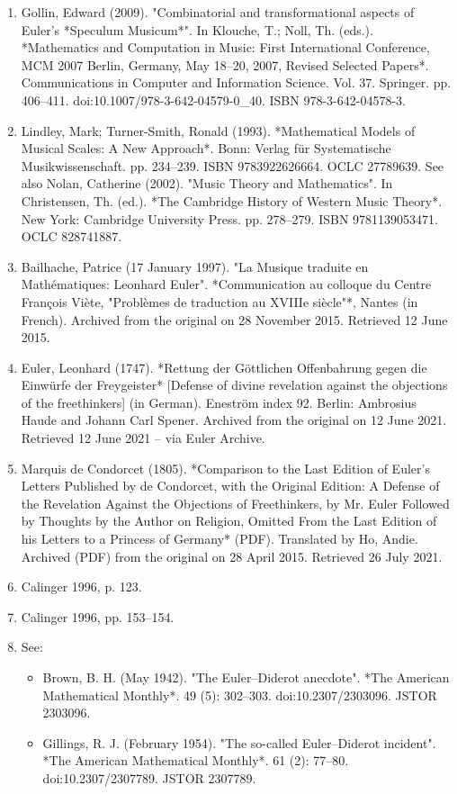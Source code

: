 \begin{enumerate}
\item Gollin, Edward (2009). "Combinatorial and transformational aspects of Euler's *Speculum Musicum*". In Klouche, T.; Noll, Th. (eds.). *Mathematics and Computation in Music: First International Conference, MCM 2007 Berlin, Germany, May 18–20, 2007, Revised Selected Papers*. Communications in Computer and Information Science. Vol. 37. Springer. pp. 406–411. doi:10.1007/978-3-642-04579-0_40. ISBN 978-3-642-04578-3.
\item Lindley, Mark; Turner-Smith, Ronald (1993). *Mathematical Models of Musical Scales: A New Approach*. Bonn: Verlag für Systematische Musikwissenschaft. pp. 234–239. ISBN 9783922626664. OCLC 27789639. See also Nolan, Catherine (2002). "Music Theory and Mathematics". In Christensen, Th. (ed.). *The Cambridge History of Western Music Theory*. New York: Cambridge University Press. pp. 278–279. ISBN 9781139053471. OCLC 828741887.
\item Bailhache, Patrice (17 January 1997). "La Musique traduite en Mathématiques: Leonhard Euler". *Communication au colloque du Centre François Viète, "Problèmes de traduction au XVIIIe siècle"*, Nantes (in French). Archived from the original on 28 November 2015. Retrieved 12 June 2015.
\item Euler, Leonhard (1747). *Rettung der Göttlichen Offenbahrung gegen die Einwürfe der Freygeister* [Defense of divine revelation against the objections of the freethinkers] (in German). Eneström index 92. Berlin: Ambrosius Haude and Johann Carl Spener. Archived from the original on 12 June 2021. Retrieved 12 June 2021 – via Euler Archive.
\item Marquis de Condorcet (1805). *Comparison to the Last Edition of Euler's Letters Published by de Condorcet, with the Original Edition: A Defense of the Revelation Against the Objections of Freethinkers, by Mr. Euler Followed by Thoughts by the Author on Religion, Omitted From the Last Edition of his Letters to a Princess of Germany* (PDF). Translated by Ho, Andie. Archived (PDF) from the original on 28 April 2015. Retrieved 26 July 2021.
\item Calinger 1996, p. 123.
\item Calinger 1996, pp. 153–154.
\item See:
\begin{itemize}
\item Brown, B. H. (May 1942). "The Euler–Diderot anecdote". *The American Mathematical Monthly*. 49 (5): 302–303. doi:10.2307/2303096. JSTOR 2303096.
\item Gillings, R. J. (February 1954). "The so-called Euler–Diderot incident". *The American Mathematical Monthly*. 61 (2): 77–80. doi:10.2307/2307789. JSTOR 2307789.

\end{itemize}
\end{enumerate}
